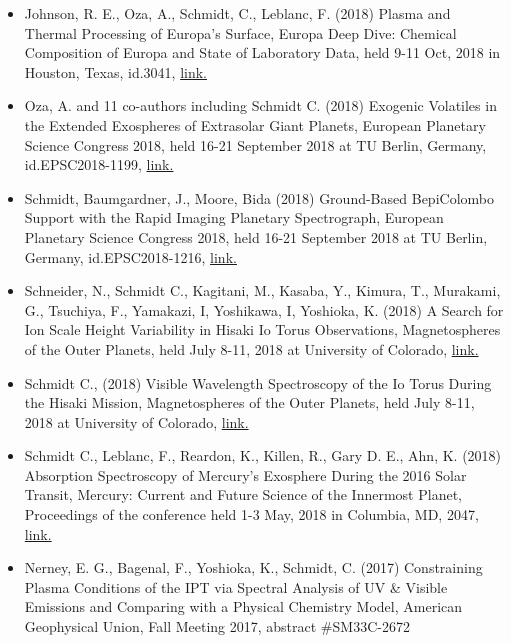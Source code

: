 \documentclass[12pt]{report}
\begin{document}
\begin{itemize}
   \item Johnson, R. E., Oza, A., Schmidt, C., Leblanc, F. (2018) Plasma and Thermal Processing of Europa's Surface, Europa Deep Dive: Chemical Composition of Europa and State of Laboratory Data, held 9-11 Oct, 2018 in Houston, Texas, id.3041, \href{https://www.hou.usra.edu/meetings/europadeepdive2018/pdf/3041.pdf}{link.} 
   \item Oza, A. and 11 co-authors including Schmidt C. (2018) Exogenic Volatiles in the Extended Exospheres of Extrasolar Giant Planets, European Planetary Science Congress 2018, held 16-21 September 2018 at TU Berlin, Germany, id.EPSC2018-1199, \href{https://meetingorganizer.copernicus.org/EPSC2018/EPSC2018-1199-2.pdf}{link.} 
   \item Schmidt, Baumgardner, J., Moore, Bida (2018) Ground-Based BepiColombo Support with the Rapid Imaging Planetary Spectrograph, European Planetary Science Congress 2018, held 16-21 September 2018 at TU Berlin, Germany, id.EPSC2018-1216, \href{https://meetingorganizer.copernicus.org/EPSC2018/EPSC2018-1216-2.pdf}{link.} 
   \item Schneider, N., Schmidt C., Kagitani, M., Kasaba, Y., Kimura, T., Murakami, G., Tsuchiya, F., Yamakazi, I, Yoshikawa, I, Yoshioka, K. (2018) A Search for Ion Scale Height Variability in Hisaki Io Torus Observations, Magnetospheres of the Outer Planets, held July 8-11, 2018 at University of Colorado, \href{https://lasp.colorado.edu/home/mop/files/2018/07/Mop2018-Program-Online-PDF-A-Version-No-Covers.pdf/}{link.} 
   \item Schmidt C., (2018) Visible Wavelength Spectroscopy of the Io Torus During the Hisaki Mission, Magnetospheres of the Outer Planets, held July 8-11, 2018 at University of Colorado, \href{https://lasp.colorado.edu/home/mop/files/2018/07/Mop2018-Program-Online-PDF-A-Version-No-Covers.pdf/}{link.} 
   \item Schmidt C., Leblanc, F., Reardon, K., Killen, R., Gary D. E., Ahn, K. (2018) Absorption Spectroscopy of Mercury's Exosphere During the 2016 Solar Transit, Mercury: Current and Future Science of the Innermost Planet, Proceedings of the conference held 1-3 May, 2018 in Columbia, MD, 2047, \href{https://www.hou.usra.edu/meetings/mercury2018/pdf/6022.pdf}{link.} 
   \item Nerney, E. G., Bagenal, F., Yoshioka, K., Schmidt, C. (2017) Constraining Plasma Conditions of the IPT via Spectral Analysis of UV \& Visible Emissions and Comparing with a Physical Chemistry Model, American Geophysical Union, Fall Meeting 2017, abstract \#SM33C-2672

\end{itemize}
\end{document}
